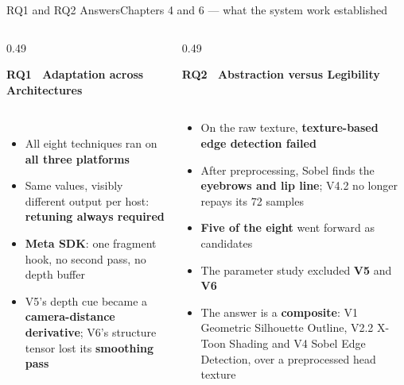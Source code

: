 \documentclass[aspectratio=169,10pt]{beamer}
\newcommand{\hl}[1]{{\color{knblue}\textbf{#1}}}
\newcommand{\good}[1]{{\color{kngreen}\textbf{#1}}}
\newcommand{\bad}[1]{{\color{knred}\textbf{#1}}}
\newcommand{\panelhead}[1]{\noindent\colorbox{kncyan}{\parbox{0.96\textwidth}{\centering\vspace{1pt}\color{white}\scriptsize\bfseries #1\vspace{1pt}}}\\[0.25em]}
\newcommand{\panel}[1]{\noindent\colorbox{knlight}{\parbox{0.96\textwidth}{\vspace{2pt}\scriptsize
\begin{itemize}\setlength{\itemsep}{0.2em}\setlength{\leftmargini}{1.1em}#1\end{itemize}\vspace{2pt}}}}
\begin{document}
\begin{frame}{RQ1 and RQ2 Answers}{Chapters 4 and 6 — what the system work established}
  \vspace{0.4em}
  \begin{columns}[T]
    \begin{column}{0.49\textwidth}
      \panelhead{RQ1 \ Adaptation across Architectures}
      \panel{%
        \item All eight techniques ran on \hl{all three platforms}
        \item Same values, visibly different output per host: \hl{retuning always required}
        \item \bad{Meta SDK}: one fragment hook, no second pass, no depth buffer
        \item V5's depth cue became a \hl{camera-distance derivative}; V6's structure tensor lost its \hl{smoothing pass}}
    \end{column}
    \begin{column}{0.49\textwidth}
      \panelhead{RQ2 \ Abstraction versus Legibility}
      \panel{%
        \item On the raw texture, \bad{texture-based edge detection failed}
        \item After preprocessing, Sobel finds the \hl{eyebrows and lip line}; V4.2 no longer repays its 72 samples
        \item \good{Five of the eight} went forward as candidates
        \item The parameter study excluded \bad{V5} and \bad{V6}
        \item The answer is a \hl{composite}: V1 Geometric Silhouette Outline, V2.2 X-Toon Shading and V4 Sobel Edge Detection, over a preprocessed head texture}
    \end{column}
  \end{columns}
\end{frame}


\end{document}
